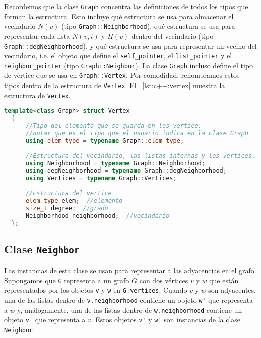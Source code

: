 \documentclass[%
    a4paper,%
    fontsize=12pt,%
    DIV=12,
    twoside,%
    openright,%
    titlepage=true,%
    headsepline,%
    toc=bibliography,%
    parskip=half,%
    cleardoublepage=empty,%
    headings=big,%
]{scrbook}
\makeatletter
\newcommand{\Code}[2][]{\lstinline[basicstyle={\ttfamily},#1]@#2@}
\newcommand{\CPPCode}[2][]{\lstinline[language=C++,basicstyle={\ttfamily},#1]@#2@}
\DeclareRobustCommand{\CPP}{C\nolinebreak[4]\hspace{-.05em}\raisebox{.4ex}{\relsize{-3}\textbf{++}}\xspace}
\def\CPP{C++}%
\makeatother
\begin{document}
Recordemos que la clase \Code{Graph} concentra las definiciones de todos los tipos que forman la estructura.  Esto incluye qué estructura se usa para almacenar el vecindario $N(v)$ (tipo \CPPCode{Graph::Neighborhood}), qué estructura se usa para representar cada lista $N(v, i)$ y $H(v)$ dentro del vecindario (tipo \CPPCode{Graph::degNeighborhood}), y qué estructura se usa para representar un vecino del vecindario, i.e. el objeto que define el \CPPCode{self_pointer}, el \CPPCode{list_pointer} y el \CPPCode{neighbor_pointer} (tipo \Code{Graph::Neighbor}).  La clase \CPPCode{Graph} incluso define el tipo de vértice que se usa en \CPPCode{Graph::Vertex}.  Por comodidad, renombramos estos tipos dentro de la estructura de \CPPCode{Vertex}.  El \lstlistingname~\ref{lst:c++:vertex} muestra la estructura de \CPPCode{Vertex}.

\begin{lstlisting}[language={C++},caption={Estructura del tipo Vertex en \CPP.},gobble=2,float=ht,label={lst:c++:vertex}]
  template<class Graph> struct Vertex
  {
      //Tipo del elemento que se guarda en los vertice;
      //notar que es el tipo que el usuario indica en la clase Graph
      using elem_type = typename Graph::elem_type;
  
      //Estructura del vecindario, las listas internas y los vertices.
      using Neighborhood = typename Graph::Neighborhood;
      using degNeighborhood = typename Graph::degNeighborhood;
      using Vertices = typename Graph::Vertices;
      
      //Estructura del vertice
      elem_type elem;  //elemento
      size_t degree;  //grado
      Neighborhood neighborhood;  //vecindario
  };
\end{lstlisting}

\subsection{Clase \texorpdfstring{\protect\CPPCode{Neighbor}}{Neighbor}}
\label{sec:c++:estructura:Neighbor.h}

Las instancias de esta clase se usan para representar a las adyacencias en el grafo.  Supongamos que \CPPCode{G} representa a un grafo $G$ con dos vértices $v$ y $w$ que están representados por los objetos \CPPCode{v} y \CPPCode{w} en \CPPCode{G.vertices}.  Cuando $v$ y $w$ son adyacentes, una de las listas dentro de \CPPCode{v.neighborhood} contiene un objeto \CPPCode{w'} que representa a $w$ y, análogamente, una de las listas dentro de \CPPCode{w.neighborhood} contiene un objeto \CPPCode{v'} que representa a $v$.  Estos objetos \CPPCode{v'} y \CPPCode{w'} son instancias de la clase \CPPCode{Neighbor}.  
\end{document}
